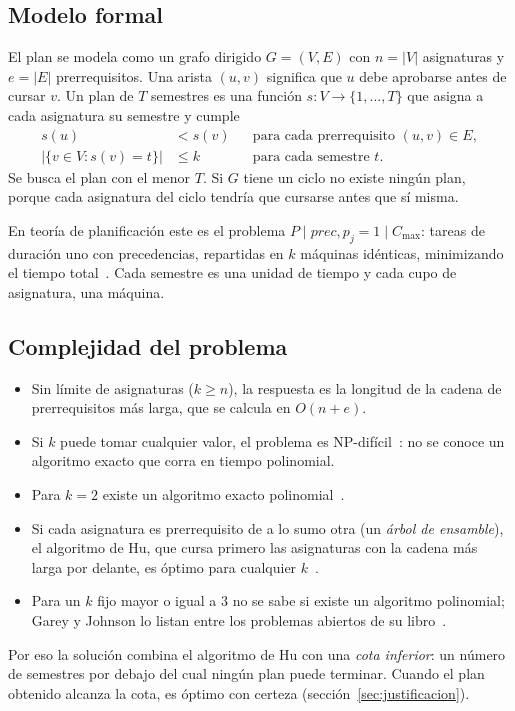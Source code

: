 \documentclass[11pt,letterpaper]{article}
\begin{document}
\subsection{Modelo formal}
El plan se modela como un grafo dirigido $G = (V, E)$ con $n = |V|$ asignaturas y $e = |E|$ prerrequisitos. Una arista $(u, v)$ significa que $u$ debe aprobarse antes de cursar $v$. Un plan de $T$ semestres es una función $s : V \to \{1, \dots, T\}$ que asigna a cada asignatura su semestre y cumple
\begin{align}
s(u) &< s(v) && \text{para cada prerrequisito } (u, v) \in E, \label{eq:prerrequisitos}\\
\bigl|\{v \in V : s(v) = t\}\bigr| &\leq k && \text{para cada semestre } t. \label{eq:limite}
\end{align}
Se busca el plan con el menor $T$. Si $G$ tiene un ciclo no existe ningún plan, porque cada asignatura del ciclo tendría que cursarse antes que sí misma.

En teoría de planificación este es el problema $P \mid \mathit{prec}, p_j = 1 \mid C_{\max}$: tareas de duración uno con precedencias, repartidas en $k$ máquinas idénticas, minimizando el tiempo total~\cite{brucker2007}. Cada semestre es una unidad de tiempo y cada cupo de asignatura, una máquina.

\subsection{Complejidad del problema}\label{sec:complejidad-problema}
\begin{itemize}
\item Sin límite de asignaturas ($k \geq n$), la respuesta es la longitud de la cadena de prerrequisitos más larga, que se calcula en $O(n + e)$.
\item Si $k$ puede tomar cualquier valor, el problema es NP-difícil~\cite{ullman1975,lenstra1978}: no se conoce un algoritmo exacto que corra en tiempo polinomial.
\item Para $k = 2$ existe un algoritmo exacto polinomial~\cite{coffman1972}.
\item Si cada asignatura es prerrequisito de a lo sumo otra (un \emph{árbol de ensamble}), el algoritmo de Hu, que cursa primero las asignaturas con la cadena más larga por delante, es óptimo para cualquier $k$~\cite{hu1961}.
\item Para un $k$ fijo mayor o igual a 3 no se sabe si existe un algoritmo polinomial; Garey y Johnson lo listan entre los problemas abiertos de su libro~\cite{garey1979}.
\end{itemize}
Por eso la solución combina el algoritmo de Hu con una \emph{cota inferior}: un número de semestres por debajo del cual ningún plan puede terminar. Cuando el plan obtenido alcanza la cota, es óptimo con certeza (sección~\ref{sec:justificacion}).
\end{document}
